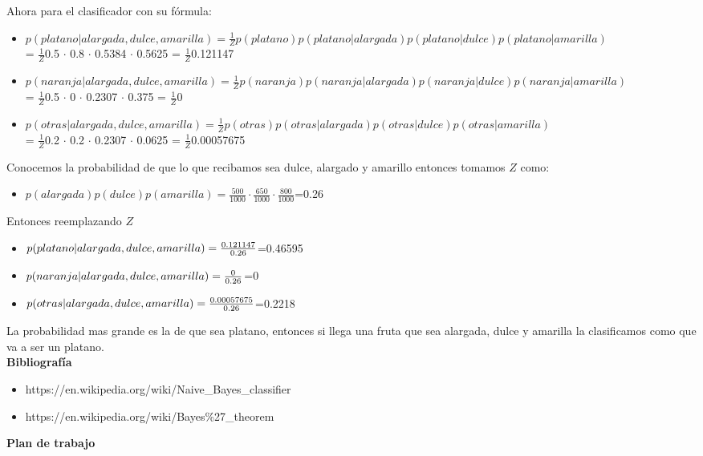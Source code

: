 \documentclass{article}
\begin{document}
  Ahora para el clasificador con su fórmula:
  \begin{itemize}
   \item $p(platano|alargada,dulce,amarilla)=\frac{1}{Z}p(platano)p(platano|alargada)p(platano|dulce)p(platano|amarilla)$ \\=
   $\frac{1}{Z}$0.5 $\cdot$ 0.8 $\cdot$ 0.5384 $\cdot$ 0.5625 = $\frac{1}{Z}$0.121147
   \item $p(naranja|alargada,dulce,amarilla)=\frac{1}{Z}p(naranja)p(naranja|alargada)p(naranja|dulce)p(naranja|amarilla)$ \\=
   $\frac{1}{Z}$0.5 $\cdot$ 0 $\cdot$ 0.2307 $\cdot$ 0.375 = $\frac{1}{Z}$0
   \item $p(otras|alargada,dulce,amarilla)=\frac{1}{Z}p(otras)p(otras|alargada)p(otras|dulce)p(otras|amarilla)$ \\=
   $\frac{1}{Z}$0.2 $\cdot$ 0.2 $\cdot$ 0.2307 $\cdot$ 0.0625 = $\frac{1}{Z}$0.00057675
  \end{itemize}
  Conocemos la probabilidad de que lo que recibamos sea dulce, alargado y amarillo entonces tomamos $Z$ como:
  \begin{itemize}
   \item $p(alargada)p(dulce)p(amarilla) = \frac{500}{1000}\cdot\frac{650}{1000}\cdot\frac{800}{1000}$=0.26
  \end{itemize}
  Entonces reemplazando $Z$
  \begin{itemize}
   \item $p(platano|alargada,dulce,amarilla) = \frac{0\ldotp121147}{0\ldotp26}$=0.46595
   \item $p(naranja|alargada,dulce,amarilla) = \frac{0}{0\ldotp26}$=0
   \item $p(otras|alargada,dulce,amarilla) = \frac{0\ldotp00057675}{0\ldotp26}$=0.2218
  \end{itemize}
  La probabilidad mas grande es la de que sea platano, entonces si llega una fruta que sea alargada, dulce y amarilla la clasificamos como que va a ser un
  platano.\\

{\bf Bibliografía}
\begin{itemize}
 \item https://en.wikipedia.org/wiki/Naive\_Bayes\_classifier
 \item https://en.wikipedia.org/wiki/Bayes\%27\_theorem
\end{itemize}

{\bf Plan de trabajo}\\
\end{document}
